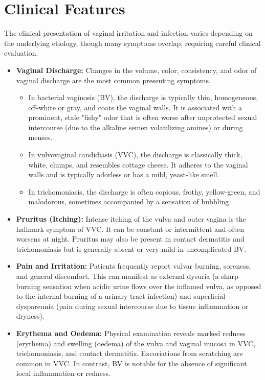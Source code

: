 \section*{Clinical Features}
The clinical presentation of vaginal irritation and infection varies depending on the underlying etiology, though many symptoms overlap, requiring careful clinical evaluation.
\begin{itemize}
    \item \textbf{Vaginal Discharge:} Changes in the volume, color, consistency, and odor of vaginal discharge are the most common presenting symptoms.
    \begin{itemize}
        \item In bacterial vaginosis (BV), the discharge is typically thin, homogeneous, off-white or gray, and coats the vaginal walls. It is associated with a prominent, stale "fishy" odor that is often worse after unprotected sexual intercourse (due to the alkaline semen volatilizing amines) or during menses.
        \item In vulvovaginal candidiasis (VVC), the discharge is classically thick, white, clumps, and resembles cottage cheese. It adheres to the vaginal walls and is typically odorless or has a mild, yeast-like smell.
        \item In trichomoniasis, the discharge is often copious, frothy, yellow-green, and malodorous, sometimes accompanied by a sensation of bubbling.
    \end{itemize}
    \item \textbf{Pruritus (Itching):} Intense itching of the vulva and outer vagina is the hallmark symptom of VVC. It can be constant or intermittent and often worsens at night. Pruritus may also be present in contact dermatitis and trichomoniasis but is generally absent or very mild in uncomplicated BV.
    \item \textbf{Pain and Irritation:} Patients frequently report vulvar burning, soreness, and general discomfort. This can manifest as external dysuria (a sharp burning sensation when acidic urine flows over the inflamed vulva, as opposed to the internal burning of a urinary tract infection) and superficial dyspareunia (pain during sexual intercourse due to tissue inflammation or dryness).
    \item \textbf{Erythema and Oedema:} Physical examination reveals marked redness (erythema) and swelling (oedema) of the vulva and vaginal mucosa in VVC, trichomoniasis, and contact dermatitis. Excoriations from scratching are common in VVC. In contrast, BV is notable for the absence of significant local inflammation or redness.

\end{itemize}
